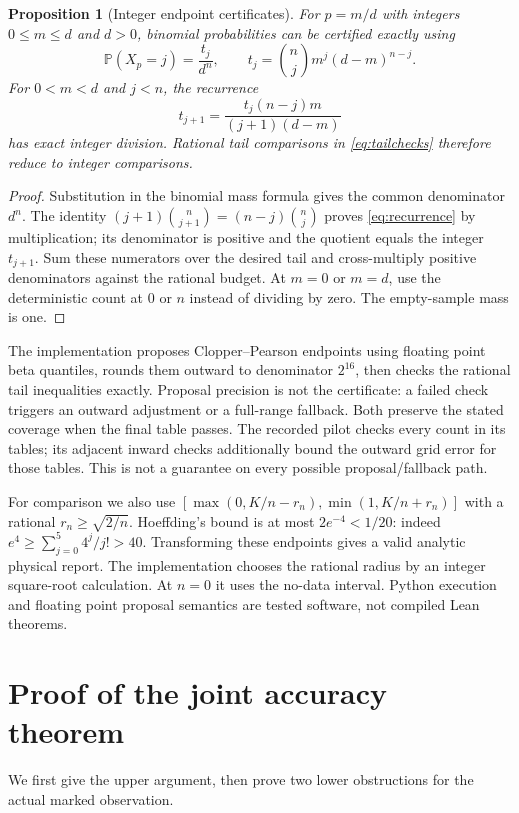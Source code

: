 \documentclass[11pt]{article}
\newtheorem{proposition}[theorem]{Proposition}
\theoremstyle{remark}
\newcommand{\Prb}{\mathbb P}
\begin{document}
\begin{proposition}[Integer endpoint certificates]\label{prop:certificate}
For $p=m/d$ with integers $0\le m\le d$ and $d>0$, binomial probabilities
can be certified exactly using
\[
 \Prb(X_p=j)=\frac{t_j}{d^n},\qquad
 t_j=\binom njm^j(d-m)^{n-j}.
\]
For $0<m<d$ and $j<n$, the recurrence
\begin{equation}\label{eq:recurrence}
 t_{j+1}=\frac{t_j(n-j)m}{(j+1)(d-m)}
\end{equation}
has exact integer division. Rational tail comparisons in
\eqref{eq:tailchecks} therefore reduce to integer comparisons.
\end{proposition}
\begin{proof}
Substitution in the binomial mass formula gives the common denominator
$d^n$. The identity $(j+1)\binom n{j+1}=(n-j)\binom nj$ proves
\eqref{eq:recurrence} by multiplication; its denominator is positive and
the quotient equals the integer $t_{j+1}$. Sum these numerators over the
desired tail and cross-multiply positive denominators against the rational
budget. At $m=0$ or $m=d$, use the deterministic count at $0$ or $n$
instead of dividing by zero. The empty-sample mass is one.
\end{proof}

The implementation proposes Clopper--Pearson endpoints using floating
point beta quantiles, rounds them outward to denominator $2^{16}$, then
checks the rational tail inequalities exactly. Proposal precision is not
the certificate: a failed check triggers an outward adjustment or a
full-range fallback. Both preserve the stated coverage when the final
table passes. The recorded pilot checks every count in its tables; its
adjacent inward checks additionally bound the outward grid error for those
tables. This is not a guarantee on every possible proposal/fallback path.

For comparison we also use
$[\max(0,K/n-r_n),\min(1,K/n+r_n)]$ with a rational
$r_n\ge\sqrt{2/n}$. Hoeffding's bound is at most $2e^{-4}<1/20$:
indeed $e^4\ge\sum_{j=0}^5 4^j/j!>40$. Transforming these endpoints
gives a valid analytic physical report. The implementation chooses the
rational radius by an integer square-root calculation. At $n=0$ it uses
the no-data interval. Python execution and floating point proposal
semantics are tested software, not compiled Lean theorems.

\section{Proof of the joint accuracy theorem}\label{sec:rate}
We first give the upper argument, then prove two lower obstructions for
the actual marked observation.
\end{document}
